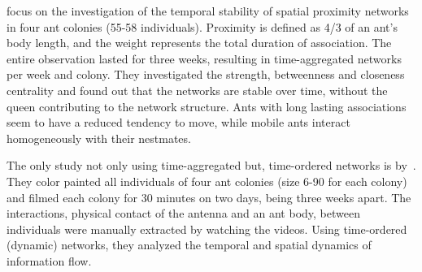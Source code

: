 \textcite{jeanson2012long} focus on the investigation of the temporal stability of spatial proximity networks in four ant colonies (55-58 individuals). Proximity is defined as 4/3 of an ant's body length, and the weight represents the total duration of association.
The entire observation lasted for three weeks, resulting in time-aggregated networks per week and colony.
They investigated the strength, betweenness and closeness centrality and found out that the networks are stable over time, without the queen contributing to the network structure.
Ants with long lasting associations seem to have a reduced tendency to move, while mobile ants interact homogeneously with their nestmates.

The only study not only using time-aggregated but, time-ordered networks is by~\textcite{blonder2011time}. They color painted all individuals of four ant colonies (size 6-90 for each colony) and filmed each colony for 30 minutes on two days, being three weeks apart.
The interactions, physical contact of the antenna and an ant body, between individuals were manually extracted by watching the videos. Using time-ordered (dynamic) networks, they analyzed the temporal and spatial dynamics of information flow.